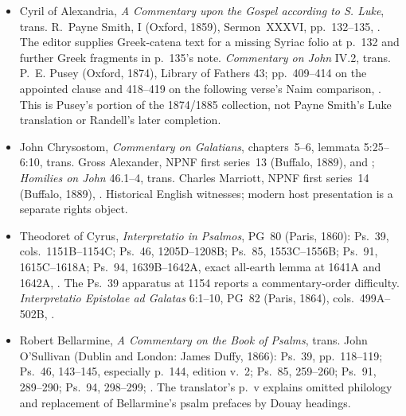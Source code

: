 {\begin{itemize}[leftmargin=1.1em,labelsep=0.35em,itemsep=0.10em,topsep=0.15em,parsep=0pt]
\item Cyril of Alexandria, \emph{A Commentary upon the Gospel according
to S. Luke}, trans. R.~Payne Smith, I (Oxford, 1859), Sermon~XXXVI,
pp.~132--135, .
The editor supplies Greek-catena text for a missing Syriac folio at
p.~132 and further Greek fragments in p.~135's note.
\emph{Commentary on John} IV.2, trans. P.~E. Pusey (Oxford, 1874),
Library of Fathers 43; pp.~409--414 on the appointed clause and
418--419 on the following verse's Naim comparison,
.
This is Pusey's portion of the 1874/1885 collection, not Payne Smith's
Luke translation or Randell's later completion.

\item John Chrysostom, \emph{Commentary on Galatians}, chapters~5--6,
lemmata 5:25--6:10, trans. Gross Alexander, NPNF first series~13
(Buffalo, 1889), 
and ;
\emph{Homilies on John} 46.1--4, trans. Charles Marriott, NPNF first
series~14 (Buffalo, 1889),
.
Historical English witnesses; modern host presentation is a separate
rights object.

\item Theodoret of Cyrus, \emph{Interpretatio in Psalmos}, PG~80
(Paris, 1860): Ps.~39, cols.~1151B--1154C; Ps.~46,
1205D--1208B; Ps.~85,
1553C--1556B; Ps.~91, 1615C--1618A; Ps.~94,
1639B--1642A, exact all-earth lemma at 1641A and 1642A,
.
The Ps.~39 apparatus at 1154 reports a commentary-order difficulty.
\emph{Interpretatio Epistolae ad Galatas} 6:1--10, PG~82
(Paris, 1864), cols.~499A--502B,
.

\item Robert Bellarmine, \emph{A Commentary on the Book of Psalms},
trans. John O'Sullivan (Dublin and London: James Duffy, 1866):
Ps.~39, pp.~118--119; Ps.~46, 143--145, especially p.~144,
edition v.~2; Ps.~85, 259--260; Ps.~91,
289--290; Ps.~94, 298--299;
.
The translator's p.~v explains omitted philology and replacement of
Bellarmine's psalm prefaces by Douay headings.


\end{itemize}}
